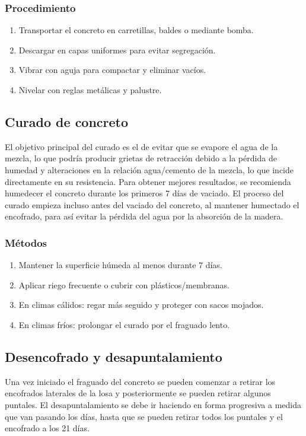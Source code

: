 \documentclass[12pt]{article}
\begin{document}
	\subsubsection{Procedimiento}
	\begin{enumerate}
		\item Transportar el concreto en carretillas, baldes o mediante bomba.
		\item Descargar en capas uniformes para evitar segregación.
		\item Vibrar con aguja para compactar y eliminar vacíos.
		\item Nivelar con reglas metálicas y palustre.
	\end{enumerate}
	
	
	\subsection{Curado de concreto}
	El objetivo principal del curado es el de evitar que se evapore el agua de la
	mezcla, lo que podría producir grietas de retracción debido a la pérdida de
	humedad y alteraciones en la relación agua/cemento de la mezcla, lo que incide
	directamente en su resistencia. Para obtener mejores resultados, se recomienda
	humedecer el concreto durante los primeros 7 días de vaciado.
	El proceso del curado empieza incluso antes del vaciado del concreto, al mantener
	humectado el encofrado, para así evitar la pérdida del agua por la absorción de la
	madera.
	
	\subsubsection{Métodos}
	\begin{enumerate}
		\item Mantener la superficie húmeda al menos durante 7 días.
		\item Aplicar riego frecuente o cubrir con plásticos/membranas.
		\item En climas cálidos: regar más seguido y proteger con sacos mojados.
		\item En climas fríos: prolongar el curado por el fraguado lento.
	\end{enumerate}
	

	
	\subsection{Desencofrado y desapuntalamiento}
	Una vez iniciado el fraguado del concreto se pueden comenzar a retirar los
	encofrados laterales de la losa y posteriormente se pueden retirar algunos
	puntales. El desapuntalamiento se debe ir haciendo en forma progresiva a medida
	que van pasando los días, hasta que se pueden retirar todos los puntales y el
	encofrado a los 21 días.
	
\end{document}
